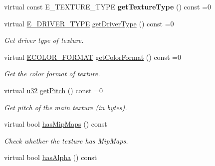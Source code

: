 \begin{DoxyCompactItemize}
\item 
virtual const E\+\_\+\+T\+E\+X\+T\+U\+R\+E\+\_\+\+T\+Y\+PE {\bfseries get\+Texture\+Type} () const  =0\hypertarget{classirr_1_1video_1_1ITexture_ab696ee26722a88a8d6974eae3713000f}{}\label{classirr_1_1video_1_1ITexture_ab696ee26722a88a8d6974eae3713000f}

\item 
virtual \hyperlink{namespaceirr_1_1video_ae35a6de6d436c76107ad157fe42356d0}{E\+\_\+\+D\+R\+I\+V\+E\+R\+\_\+\+T\+Y\+PE} \hyperlink{classirr_1_1video_1_1ITexture_a2de30082b35cc4d25a9d77824ab0faab}{get\+Driver\+Type} () const  =0
\begin{DoxyCompactList}\small\item\em Get driver type of texture. \end{DoxyCompactList}\item 
virtual \hyperlink{namespaceirr_1_1video_a1d5e487888c32b1674a8f75116d829ed}{E\+C\+O\+L\+O\+R\+\_\+\+F\+O\+R\+M\+AT} \hyperlink{classirr_1_1video_1_1ITexture_a5c1ce696f49f60a1d6bbabdfabf7a45d}{get\+Color\+Format} () const  =0
\begin{DoxyCompactList}\small\item\em Get the color format of texture. \end{DoxyCompactList}\item 
virtual \hyperlink{namespaceirr_a0416a53257075833e7002efd0a18e804}{u32} \hyperlink{classirr_1_1video_1_1ITexture_a9d00c75c7390735546c54c025642d1c4}{get\+Pitch} () const  =0
\begin{DoxyCompactList}\small\item\em Get pitch of the main texture (in bytes). \end{DoxyCompactList}\item 
virtual bool \hyperlink{classirr_1_1video_1_1ITexture_a37444068f2f292c43c2ffd516a32a764}{has\+Mip\+Maps} () const 
\begin{DoxyCompactList}\small\item\em Check whether the texture has Mip\+Maps. \end{DoxyCompactList}\item 
virtual bool \hyperlink{classirr_1_1video_1_1ITexture_a38b90ca5d956bd9772f2aa8032b38cd5}{has\+Alpha} () const \hypertarget{classirr_1_1video_1_1ITexture_a38b90ca5d956bd9772f2aa8032b38cd5}{}\label{classirr_1_1video_1_1ITexture_a38b90ca5d956bd9772f2aa8032b38cd5}


\end{DoxyCompactItemize}
